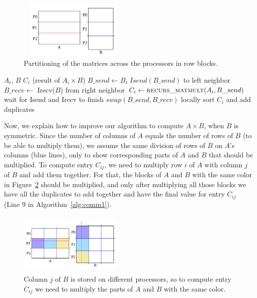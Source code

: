 \begin{figure}[tbh]
 \centering
 \includegraphics[width=5.3cm,height=2.8cm]{./figures/partition2.pdf}
 \caption{Partitioning of the matrices across the processors in row blocks.}
 \label{fig:partition}
 \Description{}
\end{figure}

\begin{algorithm}[H] 
  \caption{$C_i = A_i \times B$}
  \begin{algorithmic}[1]
    \Require $A_i$, $B$
    \Ensure  $C_i$ (result of $A_i \times B$)
    \State $B\_send \leftarrow B_i$
      \State $Isend(B\_send)$ to left neighbor
      \State $B\_recv \leftarrow$ Irecv($B$) from right neighbor
      \State $C_{i} \leftarrow \textsc{recurs\_matmult}(A_i, B\_send)$ 
      \State wait for Isend and Irecv to finish
      \State $swap(B\_send,B\_recv)$
    \EndFor
    \State locally sort $C_i$ and add duplicates
  \end{algorithmic}
  \label{alg:comm1} 
\end{algorithm}

Now, we explain how to improve our algorithm to compute $A \times B$, when $B$ is symmetric. Since the number of columns of $A$ equals the number of rows of $B$ (to be able to multiply them), we assume the same division of rows of $B$ on $A$'s columns (blue lines), only to show corresponding parts of $A$ and $B$ that should be multiplied. To compute entry $C_{ij}$, we need to multiply row $i$ of $A$ with column $j$ of $B$ and add them together.
For that, the blocks of $A$ and $B$ with the same color in Figure~\ref{fig:partition3} should be multiplied, and only after multiplying all those blocks we have all the duplicates to add together and have the final value for entry $C_{ij}$ (Line $9$ in Algorithm~\ref{alg:comm1}).

\begin{figure}[tbh]
    \centering
    \includegraphics[width=5cm,height=3cm]{./figures/partition3.pdf}
    \caption{Column $j$ of $B$ is stored on different processors, so to compute entry $C_{ij}$ we need to multiply the parts of $A$ and $B$ with the same color.}
    \label{fig:partition3}
    \Description{}
\end{figure}


